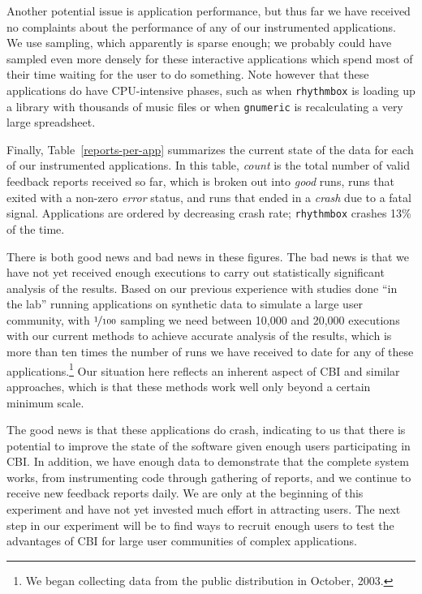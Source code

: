 \documentclass[times,10pt,twocolumn]{article}
\begin{document}
Another potential issue is application performance, but thus far we
have received no complaints about the performance of any of our
instrumented applications.  We use  sampling, which
apparently is sparse enough; we probably could have sampled even more
densely for these interactive applications which spend most of their
time waiting for the user to do something.  Note however that 
these applications do have CPU-intensive phases, such as when
{\tt rhythmbox} is loading up a library with thousands of music files or
when {\tt gnumeric} is recalculating a very large spreadsheet.

Finally, Table~\ref{reports-per-app} summarizes the current state of
the data for each of our instrumented applications.  In this table,
{\em count} is the total number of valid feedback reports received so far,
which is broken out into {\em good} runs, runs that exited with a
non-zero {\em error} status, and runs that ended in a {\em crash} due to a
fatal signal.  Applications are ordered by decreasing crash rate;
{\tt rhythmbox} crashes 13\% of the time.

There is both good news and bad news in these figures.  The bad news
is that we have not yet received enough executions to carry out
statistically significant analysis of the results.  Based on our
previous experience with studies done ``in the lab'' running
applications on synthetic data to simulate a large user community,
with $\nicefrac{1}{100}$ sampling we need between 10,000 and 20,000
executions with our current methods to achieve accurate analysis of
the results, which is more than ten times the number of runs we have
received to date for any of these applications.\footnote{We began
collecting data from the public distribution in October, 2003.}  Our
situation here reflects an inherent aspect of CBI and similar
approaches, which is that these methods work well only beyond a
certain minimum scale.

The good news is that these applications do crash,
indicating to us that there is potential to improve the state
of the software given enough users participating in CBI.  In addition,
we have enough data to demonstrate that the complete system works, from
instrumenting code through gathering of reports, and we continue to
receive new feedback reports daily.  We are only at the beginning of this
experiment and have not yet invested much effort in attracting users. 
The next step in our experiment will be
to find ways to recruit enough users to test the advantages of CBI
for large user communities of complex applications.
\end{document}
